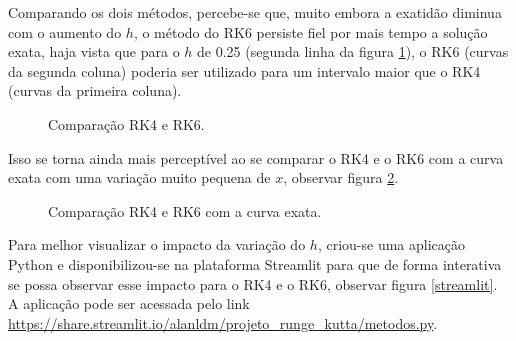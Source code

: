 \documentclass[a4paper,11pt]{article}
\begin{document}
    Comparando os dois métodos, percebe-se que, muito embora a exatidão diminua com o aumento do $h$, o método do RK6 persiste fiel por mais tempo a solução exata, haja vista que para o $h$ de 0.25 (segunda linha da figura \ref{comp1}), o RK6 (curvas da segunda coluna) poderia ser utilizado para um intervalo maior que o RK4 (curvas da primeira coluna).
    
    \begin{figure}[H]
        \centering
        \caption[width=\columnwidth]{Comparação RK4 e RK6.}
        \label{comp1}
    \end{figure}
    
    Isso se torna ainda mais perceptível ao se comparar o RK4 e o RK6 com a curva exata com uma variação muito pequena de $x$, observar figura \ref{comp2}.
    
    \begin{figure}[H]
        \centering
        \caption[width=\columnwidth]{Comparação RK4 e RK6 com a curva exata.}
        \label{comp2}
    \end{figure}
    
    Para melhor visualizar o impacto da variação do $h$, criou-se uma aplicação Python e disponibilizou-se na plataforma Streamlit para que de forma interativa se possa observar esse impacto para o RK4 e o RK6, observar figura \ref{streamlit}. A aplicação pode ser acessada pelo link \url{https://share.streamlit.io/alanldm/projeto_runge_kutta/metodos.py}.
    
\end{document}
